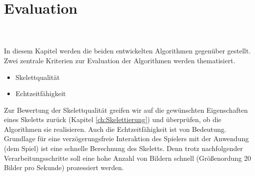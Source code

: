 \chapter{Evaluation}
\label{ch:evaluation}
\\\\
In diesem Kapitel werden die beiden entwickelten Algorithmen gegenüber gestellt. Zwei zentrale Kriterien zur Evaluation der Algorithmen werden thematisiert.
\begin{itemize}
\item Skelettqualität
\item Echtzeitfähigkeit
\end{itemize}
Zur Bewertung der Skelettqualität greifen wir auf die
gewünschten Eigenschaften eines Skeletts zurück (Kapitel \ref{ch:Skelettierung}) und überprüfen, ob die Algorithmen sie realisieren. Auch die Echtzeitfähigkeit ist von Bedeutung. Grundlage für eine verzögerungsfreie Interaktion des Spielers mit der Anwendung (dem Spiel) ist eine schnelle Berechnung des Skeletts. Denn trotz nachfolgender Verarbeitungsschritte soll eine hohe Anzahl von Bildern schnell (Größenordung 20 Bilder pro Sekunde) prozessiert werden.

